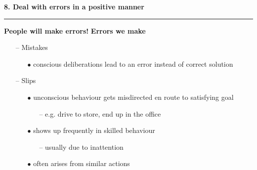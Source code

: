 \documentclass[pdf]{beamer}
\begin{document}
\begin{frame}
{\textbf{8. Deal with errors in a positive manner}}{\textcolor{red}{\rule{12cm}{1.2pt}}}

	\textbf{People will make errors!}\newline\newline
	\bigskip
	\textbf{Errors we make}
	\begin{itemize}
    	\item[--]Mistakes
		\begin{itemize}
        	\item[$\bullet$]conscious deliberations lead to an error instead of correct solution\newline
        \end{itemize}
        \item[--] Slips
        \begin{itemize}
        	\item[$\bullet$]unconscious behaviour gets misdirected en route to satisfying goal
			\begin{itemize}
					\item[--]e.g. drive to store, end up in the office\newline
				\end{itemize}
			\item[$\bullet$]shows up frequently in skilled behaviour
			\begin{itemize}
					\item[--]usually due to inattention\newline
				\end{itemize}
			\item[$\bullet$]often arises from similar actions\newline \newline \newline
        \end{itemize}
	\end{itemize}
\end{frame}
\end{document}
